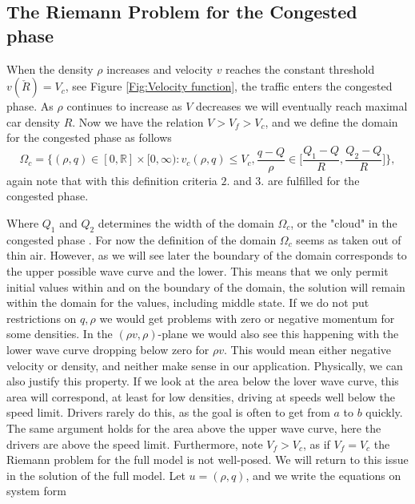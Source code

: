 \documentclass[10pt]{article}
\numberwithin{equation}{section}
\begin{document}
\subsection{The Riemann Problem for the Congested phase}\label{RPCongPh}
When the density $\rho$ increases and velocity $v$ reaches the constant threshold $v(\check R) = V_c$, see Figure \ref{Fig:Velocity function}, the traffic enters the congested phase. As $\rho$ continues to increase as $V$ decreases we will eventually reach maximal car density $R$. Now we have the relation $ V > V_f > V_c $, and we define the domain for the congested phase as follows \begin{equation}
    \Omega_c = \Bigg\{(\rho, q) \in [0, \mathbb{R}] \times [0, \infty) : v_c(\rho, q) \leq V_c, \frac{q-Q}{\rho} \in \Bigg[\frac{Q_1 - Q}{R}, \frac{Q_2 - Q}{R} \Bigg]  \Bigg\},
    \label{Domain congested ph}
\end{equation} again note that with this definition criteria $2.$ and $3.$ are fulfilled for the congested phase. 
\begin{figure}
    
\end{figure}{}
Where $Q_1$ and $Q_2$ determines the width of the domain $\Omega_{c}$, or the "cloud" in the congested phase \cite{Colombo2003}. For now the definition of the domain $\Omega_c$ seems as taken out of thin air. However, as we will see later the boundary of the domain corresponds to the upper possible wave curve and the lower. This means that we only permit initial values within and on the boundary of the domain, the solution will remain within the domain for the values, including middle state. If we do not put restrictions on $q, \rho$ we would get problems with zero or negative momentum for some densities. In the $(\rho v, \rho)$-plane we would also see this happening with the lower wave curve dropping below zero for $\rho v$. This would mean either negative velocity or density, and neither make sense in our application. Physically, we can also justify this property. If we look at the area below the lover wave curve, this area will correspond, at least for low densities, driving at speeds well below the speed limit. Drivers rarely do this, as the goal is often to get from $a$ to $b$ quickly. The same argument holds for the area above the upper wave curve, here the drivers are above the speed limit.  Furthermore, note $V_f > V_c$, as if $V_f = V_c$ the Riemann problem for the full model is not well-posed. We will return to this issue in the solution of the full model. Let $ u = (\rho, q)$, and we write the equations on system form
\end{document}

